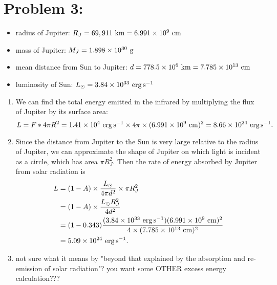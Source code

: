 \documentclass[11pt,letterpaper]{article}
\begin{document}
\section*{Problem 3:}
\begin{itemize}
    \item radius of Jupiter: $R_J = 69,911~{\rm km} = 6.991\times 10^{9}~{\rm cm}$
    \item mass of Jupiter: $M_J = 1.898\times 10^{30}~{\rm g}$
    \item mean distance from Sun to Jupiter: $d = 778.5 \times 10^{6}~{\rm km} = 7.785 \times 10^{13}~{\rm cm}$
    \item luminosity of Sun: $L_\odot = 3.84 \times 10^{33}~{\rm erg\,s^{-1}}$
\end{itemize}

\begin{enumerate}[label=(\alph*)]
    
    \item We can find the total energy emitted in the infrared by multiplying the flux of Jupiter by its surface area:
        \begin{equation*}
            L = F*4\pi R^2 = 1.41\times 10^{4}~{\rm erg\,s^{-1}}\times 4\pi\times (6.991 \times 10^{9}~{\rm cm})^2 = 8.66\times 10^{24}~{\rm erg\,s^{-1}}.
        \end{equation*}
   
    \item Since the distance from Jupiter to the Sun is very large relative to the radius of Jupiter, we can approximate the shape of Jupiter on which light is incident as a circle, which has area $\pi R_J^2.$ Then the rate of energy absorbed by Jupiter from solar radiation is 
    \begin{align*}
        L &= (1-A)\times \frac{L_\odot}{4\pi d^2}\times \pi R_J^2 \\
          &= (1-A)\times \frac{L_\odot R_J^2}{4d^2} \\
          &= (1-0.343)\frac{(3.84 \times 10^{33}~{\rm erg\,s^{-1}}) (6.991 \times 10^{9}~{\rm cm})^2}{4\times (7.785 \times 10^{13}~{\rm cm})^2} \\
          &= 5.09\times 10^{24}~{\rm erg\,s^{-1}}.
    \end{align*}
    
    \item
        {\huge not sure what it means by "beyond that explained by the absorption and re-emission of solar radiation"? you want some OTHER excess energy calculation???}


\end{enumerate}
\end{document}
